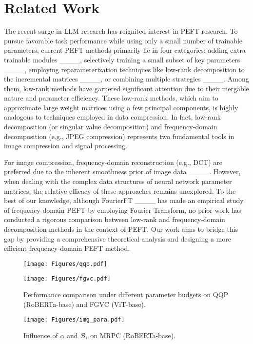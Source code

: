 \section{Related Work}
The recent surge in LLM research has reignited interest in PEFT research. To pursue favorable task performance while using only a small number of trainable parameters, current PEFT methods primarily lie in four categories: adding extra trainable modules ____, selectively training a small subset of key parameters ____, employing reparameterization techniques like low-rank decomposition to the incremental matrices ____, or combining multiple strategies ____. Among them, low-rank methods have garnered significant attention due to their mergable nature and parameter efficiency. These low-rank methods, which aim to approximate large weight matrices using a few principal components, is highly analogous to techniques employed in data compression. In fact, low-rank decomposition (or singular value decomposition) and frequency-domain decomposition (e.g., JPEG compression) represents two fundamental tools in image compression and signal processing.
    
    For image compression, frequency-domain reconstruction (e.g., DCT) are preferred due to the inherent smoothness prior of image data ____. However, when dealing with the complex data structures of neural network parameter matrices, the relative efficacy of these approaches remains unexplored. To the best of our knowledge, although FourierFT ____ has made an empirical study of frequency-domain PEFT by employing Fourier Transform, no prior work has conducted a rigorous comparison between low-rank and frequency-domain decomposition methods in the context of PEFT. Our work aims to bridge this gap by providing a comprehensive theoretical analysis and designing a more efficient frequency-domain PEFT method. 

\begin{figure}[t]
    \centering
    \begin{minipage}{0.63\textwidth}
        \centering
    \begin{minipage}[t]{0.43\linewidth}
    \centering
    \texttt{[image: Figures/qqp.pdf]}
    \end{minipage}%
    \begin{minipage}[t]{0.43\linewidth}
    \centering
    \texttt{[image: Figures/fgvc.pdf]}
    \end{minipage}
    \centering
    \caption{Performance comparison under different parameter budgets on QQP (RoBERTa-base) and FGVC (ViT-base).}
    \label{fig:budget}
    \end{minipage}
    \hfill
    \begin{minipage}{0.32\textwidth}
        \centering
        \texttt{[image: Figures/img\_para.pdf]}
        \caption{Influence of $\alpha$ and $\mathcal{B}_s$ on MRPC (RoBERTa-base).}
        \label{fig:parameter_sen}
    \end{minipage}
    \vspace{-13pt}
\end{figure}